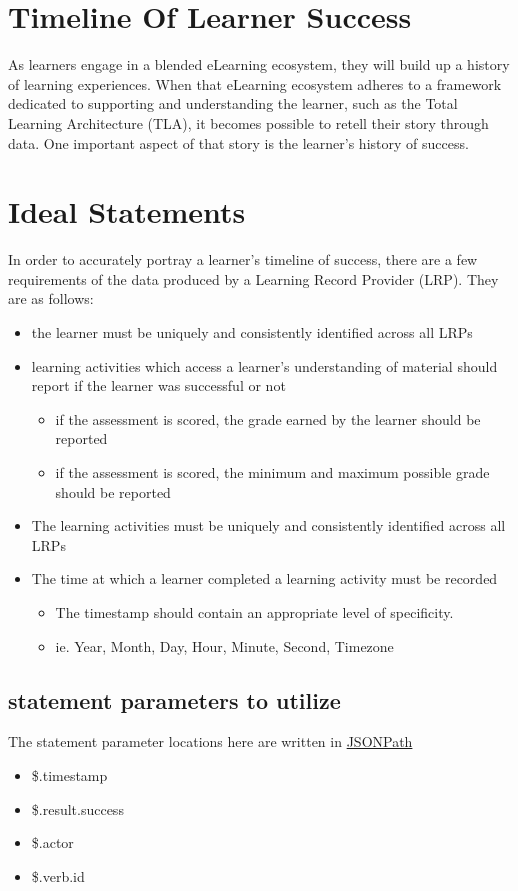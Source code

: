 \documentclass{article}
\begin{document}
\section*{Timeline Of Learner Success}
As learners engage in a blended eLearning ecosystem, they will build up a history of learning experiences. When that eLearning ecosystem adheres to a framework dedicated to supporting and understanding the learner, such as the Total Learning Architecture (TLA), it becomes possible to retell their story through data. One important aspect of that story is the learner's history of success.

\section{Ideal Statements}
In order to accurately portray a learner's timeline of success, there are a few requirements of the data produced by a Learning Record Provider (LRP). They are as follows:
\begin{itemize}
\item the learner must be uniquely and consistently identified across all LRPs
\item learning activities which access a learner's understanding of material should report if the learner was successful or not
  \begin{itemize}
  \item if the assessment is scored, the grade earned by the learner should be reported
  \item if the assessment is scored, the minimum and maximum possible grade should be reported
  \end{itemize}
\item The learning activities must be uniquely and consistently identified across all LRPs
\item The time at which a learner completed a learning activity must be recorded
  \begin{itemize}
  \item The timestamp should contain an appropriate level of specificity.
  \item ie. Year, Month, Day, Hour, Minute, Second, Timezone
  \end{itemize}

\end{itemize}

\subsection{statement parameters to utilize}
The statement parameter locations here are written in \href{http://goessner.net/articles/JsonPath/}{JSONPath}
\begin{itemize}
  \item \$.timestamp
  \item \$.result.success
  \item \$.actor
  \item \$.verb.id
  \end{itemize}
\end{document}
